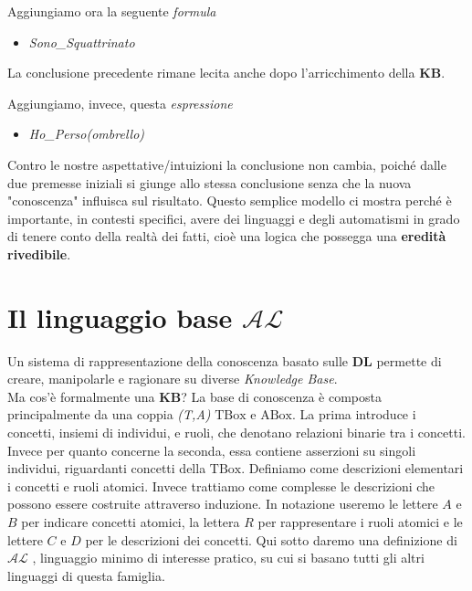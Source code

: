 Aggiungiamo ora la seguente \textit{formula}
\begin{itemize}
	\item[] \textit{Sono\_Squattrinato}
\end{itemize}
La conclusione precedente rimane lecita anche dopo l'arricchimento della \textbf{KB}.

Aggiungiamo, invece, questa \textit{espressione}
\begin{itemize}
	\item[] \textit{Ho\_Perso(ombrello)}
\end{itemize}
Contro le nostre aspettative/intuizioni la conclusione non cambia, poiché dalle due premesse 
iniziali si giunge allo stessa conclusione senza che la nuova "conoscenza" influisca sul risultato.
Questo semplice modello ci mostra perché è importante, in contesti
specifici, avere dei linguaggi e degli automatismi in grado di tenere conto della 
realtà dei fatti, cioè una logica che possegga una \textbf{eredità rivedibile}.
\section{Il linguaggio base $\mathcal{AL}$}
Un sistema di rappresentazione della conoscenza basato sulle \textbf{DL}
permette di creare, manipolarle e ragionare su diverse \textit{Knowledge Base}.\\
Ma cos'è formalmente una \textbf{KB}?
La base di conoscenza è composta principalmente da una coppia \textit{(T,A)} 
$\mathrm{TBox} \text{ e } \mathrm{ABox}$.
La prima introduce i concetti, insiemi di individui, e ruoli, che
denotano relazioni binarie tra i concetti. \\
Invece per quanto concerne la seconda, essa contiene asserzioni su singoli individui, riguardanti 
concetti della $\mathrm{TBox}$.
Definiamo come descrizioni elementari i concetti e ruoli atomici. Invece trattiamo come 
complesse le descrizioni che possono essere costruite attraverso induzione.
In notazione useremo le lettere $A$ e $B$ per indicare
concetti atomici, la lettera $R$ per rappresentare i ruoli atomici e le lettere $C$ e
$D$ per le descrizioni dei concetti. Qui sotto daremo una definizione di $\mathcal{AL}$ \cite{DLHandbook},
linguaggio minimo di interesse pratico, su cui si basano tutti gli altri linguaggi di questa famiglia.

